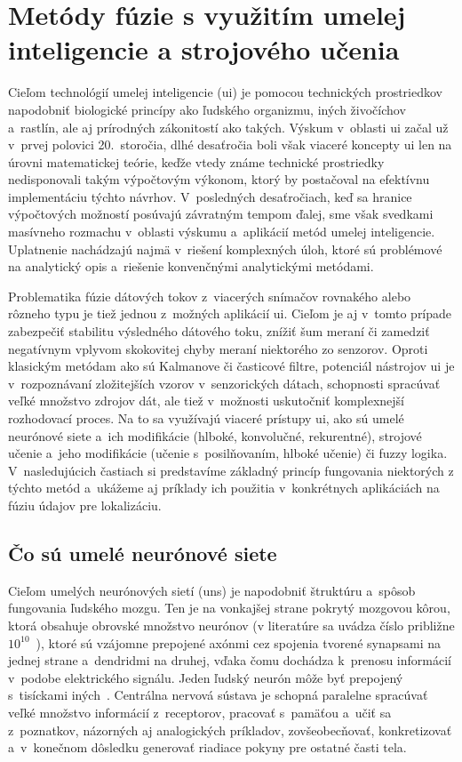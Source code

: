 \section{Metódy fúzie s využitím umelej inteligencie a strojového učenia}

Cieľom technológií umelej inteligencie (\acrshort{ui}) je pomocou technických prostriedkov napodobniť biologické princípy ako ľudského organizmu, iných živočíchov a~rastlín, ale aj prírodných zákonitostí ako takých. Výskum v~oblasti \acrshort{ui} začal už v~prvej polovici 20.\ storočia, dlhé desaťročia boli však viaceré koncepty \acrshort{ui} len na úrovni matematickej teórie, keďže vtedy známe technické prostriedky nedisponovali takým výpočtovým výkonom, ktorý by postačoval na efektívnu implementáciu týchto návrhov. V~posledných desaťročiach, keď sa hranice výpočtových možností posúvajú závratným tempom ďalej, sme však svedkami masívneho rozmachu v~oblasti výskumu a~aplikácií metód umelej inteligencie. Uplatnenie nachádzajú najmä v~riešení komplexných úloh, ktoré sú problémové na analytický opis a~riešenie konvenčnými analytickými metódami.

Problematika fúzie dátových tokov z~viacerých snímačov rovnakého alebo rôzneho typu je tiež jednou z~možných aplikácií \acrshort{ui}. Cieľom je aj v~tomto prípade zabezpečiť stabilitu výsledného dátového toku, znížiť šum meraní či zamedziť negatívnym vplyvom skokovitej chyby meraní niektorého zo senzorov. Oproti klasickým metódam ako sú Kalmanove či časticové filtre, potenciál nástrojov \acrshort{ui} je v~rozpoznávaní zložitejších vzorov v~senzorických dátach, schopnosti spracúvať veľké množstvo zdrojov dát, ale tiež v~možnosti uskutočniť komplexnejší rozhodovací proces. Na to sa využívajú viaceré prístupy \acrshort{ui}, ako sú umelé neurónové siete a~ich modifikácie (hlboké, konvolučné, rekurentné), strojové učenie a~jeho modifikácie (učenie s~posilňovaním, hlboké učenie) či fuzzy logika. V~nasledujúcich častiach si predstavíme základný princíp fungovania niektorých z týchto metód a~ukážeme aj príklady ich použitia v~konkrétnych aplikáciách na fúziu údajov pre lokalizáciu.

\subsection{Čo sú umelé neurónové siete}
  Cieľom umelých neurónových sietí (\acrshort{uns}) je napodobniť štruktúru a~spôsob fungovania ľudského mozgu. Ten je na vonkajšej strane pokrytý mozgovou kôrou, ktorá obsahuje obrovské množstvo neurónov (v literatúre sa uvádza číslo približne $10^{10}$~\cite{mehligMachineLearningNeural2021}), ktoré sú vzájomne prepojené axónmi cez spojenia tvorené synapsami na jednej strane a~dendridmi na druhej, vďaka čomu dochádza k~prenosu informácií v~podobe elektrického signálu. Jeden ľudský neurón môže byť prepojený s~tisíckami iných~\cite{mehligMachineLearningNeural2021}. Centrálna nervová sústava je schopná paralelne spracúvať veľké množstvo informácií z~receptorov, pracovať s~pamäťou a~učiť sa z~poznatkov, názorných aj analogických príkladov, zovšeobecňovať, konkretizovať a~v~konečnom dôsledku generovať riadiace pokyny pre ostatné časti tela.

